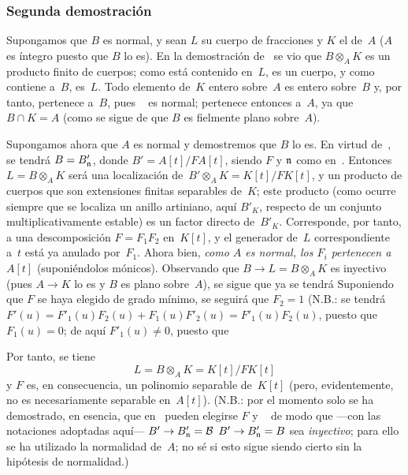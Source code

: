 \subsubsection*{Segunda demostración}
Supongamos que $B$ es normal, y sean $L$ su cuerpo de fracciones y $K$ el de~$A$ ($A$ es íntegro puesto que $B$ lo es). En la demostración de~ se vio que $B\otimes_AK$ es un producto finito de cuerpos; como está contenido en~$L$, es un cuerpo, y como contiene a~$B$, es~$L$. Todo elemento de~$K$ entero sobre~$A$ es entero sobre~$B$ y, por tanto, pertenece a~$B$, pues \ %
es normal; pertenece entonces a~$A$, ya que $B\cap K=A$ (como se sigue de que $B$ es fielmente plano sobre~$A$).

Supongamos ahora que $A$ es normal y demostremos que $B$ lo es. En virtud de~, se tendrá $B=B'_{\mathfrak{n}}$, donde $B'=A[t]/FA[t]$, siendo $F$ y $\mathfrak{n}$ como en~. Entonces $L=B\otimes_AK$ será una localización de~$B'\otimes_AK=K[t]/FK[t]$, y un producto de cuerpos que son extensiones finitas separables de~$K$; este producto (como ocurre siempre que se localiza un anillo artiniano, aquí $B'_K$, respecto de un conjunto multiplicativamente estable) es un factor directo de~$B'_K$. Corresponde, por tanto, a una descomposición $F=F_1F_2$ en~$K[t]$, y el generador de~$L$ correspondiente a~$t$ está ya anulado por~$F_1$. Ahora bien, \emph{como $A$ es normal, los $F_i$ pertenecen a~$A[t]$} (suponiéndolos mónicos). Observando que $B\to L=B\otimes_AK$ es inyectivo (pues $A\to K$ lo es y $B$ es plano sobre~$A$), se sigue que ya se tendrá
Suponiendo que $F$ se haya elegido de grado mínimo, se seguirá que $F_2=1$ (N.B.: se tendrá $F'(u)=F'_1(u)F_2(u)+F_1(u)F'_2(u)=F'_1(u)F_2(u)$, puesto que $F_1(u)=0$; de aquí $F'_1(u)\neq0$, puesto que %

Por
tanto, se tiene
\begin{equation*}
\label{eq:I.9.5.*}
\tag{$*$}L=B\otimes_AK=K[t]/FK[t]
\end{equation*}
y $F$ es, en consecuencia, un polinomio separable de~$K[t]$ (pero, evidentemente, no es necesariamente separable en~$A[t]$). (N.B.: por el momento solo se ha demostrado, en esencia, que en~ pueden elegirse $F$ y \ %
de modo que ---con las notaciones adoptadas aquí--- 
{$B'\to B'_{\mathfrak{n}}=\mathcal{B}$}
{$B'\to B'_{\mathfrak{n}}=B$}%
sea \emph{inyectivo}; para ello se ha utilizado la normalidad de~$A$; no sé si esto sigue siendo cierto sin la hipótesis de normalidad.)

